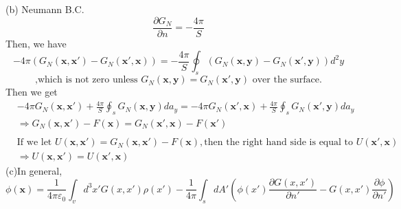 \documentclass[letterpage]{article}
\begin{document}
\noindent
(b) Neumann B.C.
\begin{equation*}
  \frac{\partial G_N}{\partial n} = -\frac{4\pi}{S}
\end{equation*}
Then, we have
\begin{equation*}
  -4\pi \left(G_N(\textbf{x},\textbf{x}')-G_N(\textbf{x}',\textbf{x})\right)
  = -\frac{4\pi}{S} \oint_s \left(G_N(\textbf{x},\textbf{y}) - G_N(\textbf{x}',
  \textbf{y})\right)d^2y
\end{equation*}
\begin{equation*}
  \text{,which is not zero unless } G_N(\textbf{x},\textbf{y}) 
  =G_N(\textbf{x}',\textbf{y}) \text{ over the surface.}
\end{equation*}
Then we get
\begin{align*}
  &-4\pi G_N(\textbf{x},\textbf{x}') + \frac{4\pi}{S} \oint_s 
  G_N (\textbf{x},\textbf{y})da_y = -4\pi G_N (\textbf{x}',\textbf{x})
  + \frac{4\pi}{S} \oint_s G_N(\textbf{x}',\textbf{y})da_y\\
  &\Rightarrow G_N (\textbf{x},\textbf{x}')-F(\textbf{x})
  = G_N(\textbf{x}',\textbf{x})-F(\textbf{x}')\\
  \\  
  &\text{If we let } U(\textbf{x},\textbf{x}') = G_N (\textbf{x},\textbf{x}')
  -F(\textbf{x}),\text{then the right hand side is equal to } U(\textbf{x}',\textbf{x})\\
  &\Rightarrow U(\textbf{x},\textbf{x}')=U(\textbf{x}',\textbf{x})
\end{align*}
\noindent
(c)In general,
\begin{equation*}
  \phi(\textbf{x}) = \frac{1}{4\pi \varepsilon_0} \int_v d^3 x' 
  G(x,x')\rho(x') - \frac{1}{4\pi} \int_s dA'
  \left(\phi(x') \frac{\partial G(x,x')}{\partial n'}
  - G(x,x') \frac{\partial \phi}{\partial n'}\right)
  
\end{equation*}
\end{document}
